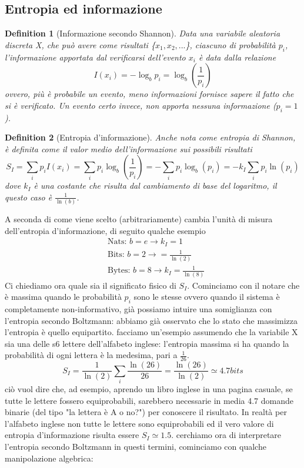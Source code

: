 \documentclass[10pt,a4paper]{article}
\newtheorem{definition}{Definition}
\begin{document}
\subsection{Entropia ed informazione}
\begin{definition}[Informazione secondo Shannon]
	Data una variabile aleatoria discreta X, che può avere come risultati \{\(x_1,x_2,...\)\}, ciascuno di probabilità \(p_i\), l'informazione apportata dal verificarsi dell'evento \(x_i\) è data dalla relazione
	\[I(x_i) = -\log_b p_i = \log_b \left(\frac{1}{p_i}\right)\]
	ovvero, più è probabile un evento, meno informazioni fornisce sapere il fatto che si è verificato. Un evento certo invece, non apporta nessuna informazione (\(p_i = 1\)). 
\end{definition}
\begin{definition}[Entropia d'informazione]
	Anche nota come entropia di Shannon, è definita come il valor medio dell'informazione sui possibili risultati
	\[S_I=\sum_ip_iI(x_i) = \sum_ip_i\log_b\left(\frac{1}{p_i}\right)=-\sum_ip_i\log_b(p_i)= -k_I\sum_ip_i\ln(p_i)\]
	dove \(k_I\) è una costante che risulta dal cambiamento di base del logaritmo, il questo caso è \(\frac{1}{\ln(b)}\). 
\end{definition}
A seconda di come viene scelto (arbitrariamente) cambia l'unità di misura dell'entropia d'informazione, di seguito qualche esempio 
\begin{align*}
	&\text{Nats: }b=e\rightarrow k_I = 1\\
	&\text{Bits: }b = 2\rightarrow =\frac{1}{\ln(2)}\\
	&\text{Bytes: }b = 8\rightarrow k_I = \frac{1}{\ln(8)}
\end{align*}
Ci chiediamo ora quale sia il significato fisico di \(S_I\). Cominciamo con il notare che è massima quando le probabilità \(p_i\) sono le stesse ovvero quando il sistema è completamente non-informativo, già possiamo intuire una somiglianza con l'entropia secondo Boltzmann: abbiamo già osservato che lo stato che massimizza l'entropia è quello equipartito. facciamo un'esempio assumendo che la variabile X sia una delle s6 lettere dell'alfabeto inglese: l'entropia massima si ha quando la probabilità di ogni lettera è la medesima, pari a $\frac{1}{26}$. 
\[S_I = \frac{1}{\ln(2)}\sum_i\frac{\ln(26)}{26}=\frac{\ln(26)}{\ln(2)}\simeq 4.7 bits\]
ciò vuol dire che, ad esempio, aprendo un libro inglese in una pagina casuale, se tutte le lettere fossero equiprobabili, sarebbero necessarie in media 4.7 domande binarie (del tipo "la lettera è A o no?") per conoscere il risultato. In realtà per l'alfabeto inglese non tutte le lettere sono equiprobabili ed il vero valore di entropia d'informazione risulta essere \(S_I \simeq 1.5\). cerchiamo ora di interpretare l'entropia secondo Boltzmann in questi termini, cominciamo con qualche manipolazione algebrica:
\end{document}
